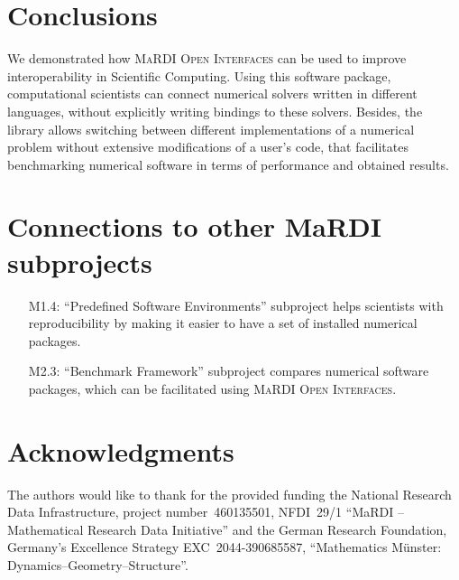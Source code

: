 \documentclass{mmposter}
\newcommand{\OIF}{\textsc{MaRDI Open Interfaces}\xspace}
\begin{document}
\section*{Conclusions}
We demonstrated how \OIF{} can be used to improve
interoperability in Scientific Computing.
Using this software package, computational scientists can connect numerical
solvers written in different languages, without explicitly writing bindings
to these solvers.
Besides, the library allows switching between different implementations
of a numerical problem without extensive modifications of a user's code,
that facilitates benchmarking numerical software in terms of performance
and obtained results.


\section*{Connections to other MaRDI subprojects}

\begin{itemize}[align=left]
  \item[\color{CEmphasis1}M1.4:] ``Predefined Software Environments'' subproject
        helps scientists with reproducibility by making it easier to have
        a set of installed numerical packages.
  \item[\color{CEmphasis1}M2.3:] ``Benchmark Framework'' subproject
        compares numerical software packages, which can be facilitated
        using \OIF{}.
\end{itemize}

\section*{Acknowledgments}
The authors would like to thank for the provided funding
the National Research Data Infrastructure,
project number~460135501, NFDI~29/1 “MaRDI – Mathematical
Research Data Initiative”
and
the German Research Foundation,
Germany's Excellence Strategy EXC~2044-390685587,
``Mathematics Münster: Dynamics--Geometry--Structure''.

\printbibliography{}



\end{document}
